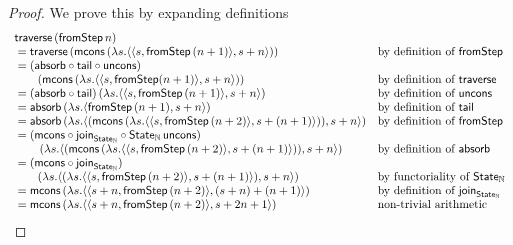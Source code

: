 \begin{proof}
We prove this by expanding definitions
$$
\begin{array}{ll}
\mathsf{traverse}\, (\mathsf{fromStep}\, n) \\
{}= \mathsf{traverse}\, (\mathsf{mcons}\, (\lambda s. \langle \langle s, \mathsf{fromStep}\, (n + 1) \rangle, s + n \rangle))
	& \mbox{by definition of }\mathsf{fromStep} \\
{}= (\mathsf{absorb} \circ \mathsf{tail} \circ \mathsf{uncons})\, \\\qquad (\mathsf{mcons}\, (\lambda s. \langle \langle s, \mathsf{fromStep} (n + 1) \rangle, s + n \rangle))
	& \mbox{by definition of }\mathsf{traverse} \\
{}= (\mathsf{absorb} \circ \mathsf{tail})\, (\lambda s. \langle \langle s, \mathsf{fromStep}\, (n + 1) \rangle, s + n \rangle)
	& \mbox{by definition of }\mathsf{uncons} \\
{}= \mathsf{absorb}\, (\lambda s. \langle \mathsf{fromStep}\, (n + 1), s + n \rangle)
	& \mbox{by definition of }\mathsf{tail} \\
{}= \mathsf{absorb}\, (\lambda s. \langle (\mathsf{mcons}\, (\lambda s. \langle \langle s, \mathsf{fromStep}\, (n + 2) \rangle, s + (n + 1) \rangle)), s + n \rangle)
	& \mbox{by definition of }\mathsf{fromStep} \\
{}= (\mathsf{mcons} \circ \mathsf{join}_{\mathsf{State}_{\mathbb{N}}} \circ \mathsf{State}_{\mathbb{N}}\,\mathsf{uncons}) \\\qquad \, (\lambda s. \langle (\mathsf{mcons}\, (\lambda s. \langle \langle s, \mathsf{fromStep}\, (n + 2) \rangle, s + (n + 1) \rangle)), s + n \rangle)
	& \mbox{by definition of }\mathsf{absorb} \\
{}= (\mathsf{mcons} \circ \mathsf{join}_{\mathsf{State}_{\mathbb{N}}})\, \\\qquad (\lambda s. \langle (\lambda s. \langle \langle s, \mathsf{fromStep}\, (n + 2) \rangle, s + (n + 1) \rangle), s + n \rangle)
	& \mbox{by functoriality of }\mathsf{State}_{\mathbb{N}} \\
{}= \mathsf{mcons}\, (\lambda s. \langle \langle s + n, \mathsf{fromStep}\,(n + 2) \rangle, (s + n) + (n + 1) \rangle)
	& \mbox{by definition of } \mathsf{join}_{\mathsf{State}_{\mathbb{N}}} \\
{}= \mathsf{mcons}\, (\lambda s. \langle \langle s + n, \mathsf{fromStep}\,(n + 2) \rangle, s + 2n + 1 \rangle)
	& \mbox{non-trivial arithmetic} \\
\end{array}
$$
\end{proof}

